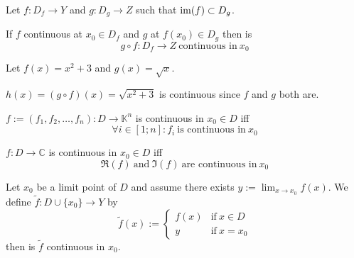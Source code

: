 \begin{proposition}\label{pro:contin_continuation}
   Let \(f: D_f \to Y\) and \(g: D_g \to Z\) such that \(\operatorname{im}(f) \subset D_g\).

   If \(f\) continuous at \(x_0 \in D_f\) and \(g\) at \(f(x_0) \in D_g\) then is
   \[g \circ f: D_f \to Z~\text{continuous in}~x_0\]
\end{proposition}
\begin{example}
   Let \(f(x) = x^2 + 3\) and \(g(x) = \sqrt{x}\).

   \(h(x) = (g \circ f)(x) = \sqrt{x^2 + 3}\) is continuous since \(f\) and \(g\) both are.
\end{example}

\begin{theorem}
   \(f := (f_1, f_2, \ldots, f_n): D \to \mathbb{K}^n\) is continuous in \(x_0 \in D\) iff
   \[\forall i \in [1; n]: f_i~\text{is continuous in}~x_0\]
\end{theorem}

\begin{theorem}
   \(f: D \to \mathbb{C}\) is continuous in \(x_0 \in D\) iff
   \[\Re(f)~\text{and}~\Im(f)~\text{are continuous in}~x_0\]
\end{theorem}

\begin{proposition}
   Let \(x_0\) be a limit point of \(D\) and assume there exists \(y := \lim_{x \to x_0} f(x)\).
   We define \(\tilde{f}: D \cup \{x_0\} \to Y\) by
   \[\tilde{f}(x) := \begin{cases}f(x) & \text{if}~x \in D\\ y & \text{if}~x = x_0\end{cases}\]
   then is \(\tilde{f}\) continuous in \(x_0\).
\end{proposition}

